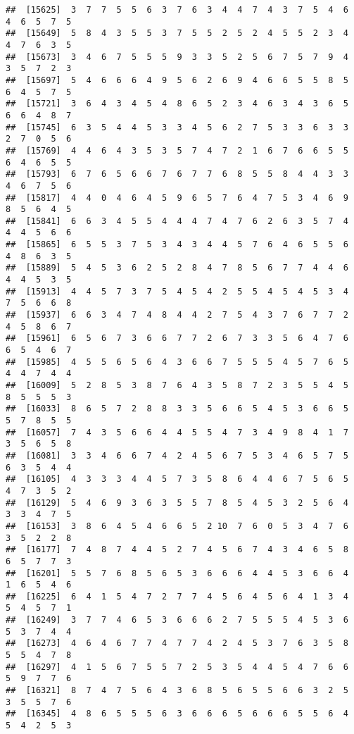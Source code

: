 \documentclass[
]{book}
\begin{document}
\begin{verbatim}
##  [15625]  3  7  7  5  5  6  3  7  6  3  4  4  7  4  3  7  5  4  6  4  6  5  7  5
##  [15649]  5  8  4  3  5  5  3  7  5  5  2  5  2  4  5  5  2  3  4  4  7  6  3  5
##  [15673]  3  4  6  7  5  5  5  9  3  3  5  2  5  6  7  5  7  9  4  3  5  7  2  3
##  [15697]  5  4  6  6  6  4  9  5  6  2  6  9  4  6  6  5  5  8  5  6  4  5  7  5
##  [15721]  3  6  4  3  4  5  4  8  6  5  2  3  4  6  3  4  3  6  5  6  6  4  8  7
##  [15745]  6  3  5  4  4  5  3  3  4  5  6  2  7  5  3  3  6  3  3  2  7  0  5  6
##  [15769]  4  4  6  4  3  5  3  5  7  4  7  2  1  6  7  6  6  5  5  6  4  6  5  5
##  [15793]  6  7  6  5  6  6  7  6  7  7  6  8  5  5  8  4  4  3  3  4  6  7  5  6
##  [15817]  4  4  0  4  6  4  5  9  6  5  7  6  4  7  5  3  4  6  9  8  5  6  4  5
##  [15841]  6  6  3  4  5  5  4  4  4  7  4  7  6  2  6  3  5  7  4  4  4  5  6  6
##  [15865]  6  5  5  3  7  5  3  4  3  4  4  5  7  6  4  6  5  5  6  4  8  6  3  5
##  [15889]  5  4  5  3  6  2  5  2  8  4  7  8  5  6  7  7  4  4  6  4  4  5  3  5
##  [15913]  4  4  5  7  3  7  5  4  5  4  2  5  5  4  5  4  5  3  4  7  5  6  6  8
##  [15937]  6  6  3  4  7  4  8  4  4  2  7  5  4  3  7  6  7  7  2  4  5  8  6  7
##  [15961]  6  5  6  7  3  6  6  7  7  2  6  7  3  3  5  6  4  7  6  6  5  4  6  7
##  [15985]  4  5  5  6  5  6  4  3  6  6  7  5  5  5  4  5  7  6  5  4  4  7  4  4
##  [16009]  5  2  8  5  3  8  7  6  4  3  5  8  7  2  3  5  5  4  5  8  5  5  5  3
##  [16033]  8  6  5  7  2  8  8  3  3  5  6  6  5  4  5  3  6  6  5  5  7  8  5  5
##  [16057]  7  4  3  5  6  6  4  4  5  5  4  7  3  4  9  8  4  1  7  3  5  6  5  8
##  [16081]  3  3  4  6  6  7  4  2  4  5  6  7  5  3  4  6  5  7  5  6  3  5  4  4
##  [16105]  4  3  3  3  4  4  5  7  3  5  8  6  4  4  6  7  5  6  5  4  7  3  5  2
##  [16129]  5  4  6  9  3  6  3  5  5  7  8  5  4  5  3  2  5  6  4  3  3  4  7  5
##  [16153]  3  8  6  4  5  4  6  6  5  2 10  7  6  0  5  3  4  7  6  3  5  2  2  8
##  [16177]  7  4  8  7  4  4  5  2  7  4  5  6  7  4  3  4  6  5  8  6  5  7  7  3
##  [16201]  5  5  7  6  8  5  6  5  3  6  6  6  4  4  5  3  6  6  4  1  6  5  4  6
##  [16225]  6  4  1  5  4  7  2  7  7  4  5  6  4  5  6  4  1  3  4  5  4  5  7  1
##  [16249]  3  7  7  4  6  5  3  6  6  6  2  7  5  5  5  4  5  3  6  5  3  7  4  4
##  [16273]  4  6  4  6  7  7  4  7  7  4  2  4  5  3  7  6  3  5  8  5  5  4  7  8
##  [16297]  4  1  5  6  7  5  5  7  2  5  3  5  4  4  5  4  7  6  6  5  9  7  7  6
##  [16321]  8  7  4  7  5  6  4  3  6  8  5  6  5  5  6  6  3  2  5  3  5  5  7  6
##  [16345]  4  8  6  5  5  5  6  3  6  6  6  5  6  6  6  5  5  6  4  5  4  2  5  3

\end{verbatim}
\end{document}
